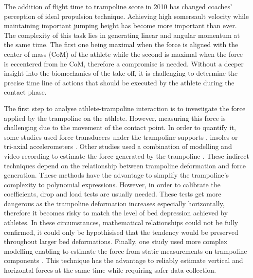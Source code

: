 The addition of flight time to trampoline score in 2010 \cite{Committee2010} has changed coaches' perception of ideal propulsion technique.
Achieving high somersault velocity while maintaining important jumping height has become more important than ever.
The complexity of this task lies in generating linear and angular momentum at the same time.
The first one being maximal when the force is aligned with the center of mass (CoM) of the athlete while the second is maximal when the force is eccentered from he CoM, therefore a compromise is needed.
Without a deeper insight into the biomechanics of the take-off, it is challenging to determine the precise time line of actions that should be executed by the athlete during the contact phase. 


The first step to analyse athlete-trampoline interaction is to investigate the force applied by the trampoline on the athlete.
However, measuring this force is challenging due to the movement of the contact point.
In order to quantify it, some studies used force transducers under the trampoline supports \cite{jacques2008determining, ando1987biomechanical, hennig1988loads}, insoles \cite{glitsch1992pressure} or tri-axial accelerometers \cite{eager2012characterisation}.
Other studies used a combination of modelling and video recording to estimate the force generated by the trampoline \cite{vaughan1980kinetic, blajer2001modeling, zuo2016finite, burke2015mechanics}.
These indirect techniques depend on the relationship between trampoline deformation and force generation.
These methods have the advantage to simplify the trampoline's complexity to polynomial expressions.
However, in order to calibrate the coefficients, drop and load tests are usually needed.
These tests get more dangerous as the trampoline deformation increases especially horizontally, therefore it becomes risky to match the level of bed depression achieved by athletes.
In these circumstances, mathematical relationships could not be fully confirmed, it could only be hypothisised that the tendency would be preserved throughout larger bed deformations.
Finally, one study used more complex modelling enabling to estimate the force from static measurements on trampoline components \cite{jacques2008determining}.
This technique has the advantage to reliably estimate vertical and horizontal forces at the same time while requiring safer data collection.


